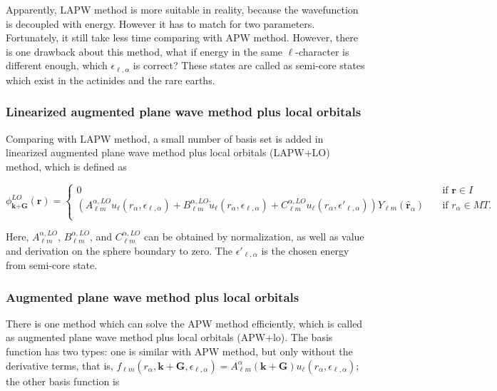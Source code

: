 \documentclass[a4paper, 12pt, titlepage,oneside,drop]{kthesis}
\begin{document}
Apparently, LAPW method is more suitable in reality, because the wavefunction is decoupled with energy. However it has to match for two parameters.
Fortunately, it still take less time comparing with APW method. However, there is one drawback about this method, what if energy in the same ${\ell}$-character is different enough, 
which $\epsilon_{\ell,\alpha}$ is correct? These states are called as semi-core states which exist in the actinides and the rare earths.

\subsubsection{Linearized augmented plane wave method plus local orbitals}
Comparing with LAPW method, a small number of basis set is added in linearized augmented plane wave method plus local orbitals (LAPW+LO) method, which is defined as


\begin{equation}\label{lap5}
\phi^{LO}_{\textbf{k}+\textbf{G}}(\textbf{r}) = 
\begin{cases} 0 & \quad \mbox{if $\textbf{r} \in {I} $}
\\
(A _{{\ell}m}^{\alpha,LO}  u_{{\ell}}(r_{\alpha}, \epsilon_{\ell,\alpha}) + B _{{\ell}m}^{\alpha,LO}  \dot{u}_{{\ell}}(r_{\alpha}, \epsilon_{\ell,\alpha}) + C _{{\ell}m}^{\alpha,LO}  u_{{\ell}}(r_{\alpha}, \epsilon'_{\ell,\alpha})){Y_{{\ell}m}(\hat{\textbf{r}}_{\alpha})} & \quad \mbox{if $r_{\alpha} \in MT. $}\\ 
\end{cases}
\end{equation}
 

Here, $A _{{\ell}m}^{\alpha,LO}$, $B _{{\ell}m}^{\alpha,LO}$, and $C _{{\ell}m}^{\alpha,LO}$ can be obtained by normalization, as well as value and derivation on the sphere boundary to zero. The $\epsilon'_{\ell,\alpha}$ is
the chosen energy from semi-core state.

\subsubsection{Augmented plane wave method plus local orbitals}

There is one method which can solve the APW method efficiently, which is called as augmented plane wave method plus local orbitals (APW+lo). The 
basis function has two types: one is similar with APW method, but only without the derivative terms, that is, $f_{{\ell}{m}} (r_{\alpha},\textbf{k}+\textbf{G}, \epsilon_{\ell,\alpha}) =  A _{{\ell}m}^{\alpha}(\textbf{k}+\textbf{G})u_{{\ell}}(r_{\alpha}, \epsilon_{\ell,\alpha})$; 
the other basis function is
\end{document}
